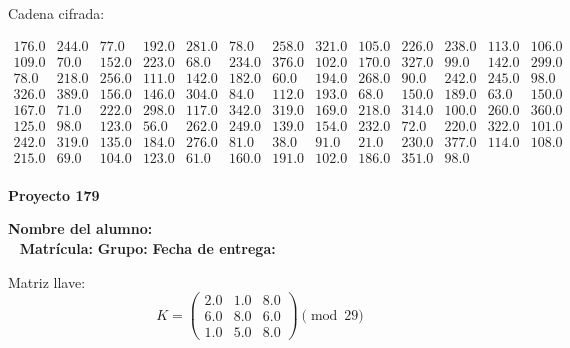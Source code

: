 \documentclass[12pt]{article}
\begin{document}
Cadena cifrada:
\begin{center}
$\begin{array}{lllllllllllll}
176.0 & 244.0 & 77.0 & 192.0 & 281.0 & 78.0 & 258.0 & 321.0 & 105.0 & 226.0 & 238.0 & 113.0 & 106.0\\
109.0 & 70.0 & 152.0 & 223.0 & 68.0 & 234.0 & 376.0 & 102.0 & 170.0 & 327.0 & 99.0 & 142.0 & 299.0\\
78.0 & 218.0 & 256.0 & 111.0 & 142.0 & 182.0 & 60.0 & 194.0 & 268.0 & 90.0 & 242.0 & 245.0 & 98.0\\
326.0 & 389.0 & 156.0 & 146.0 & 304.0 & 84.0 & 112.0 & 193.0 & 68.0 & 150.0 & 189.0 & 63.0 & 150.0\\
167.0 & 71.0 & 222.0 & 298.0 & 117.0 & 342.0 & 319.0 & 169.0 & 218.0 & 314.0 & 100.0 & 260.0 & 360.0\\
125.0 & 98.0 & 123.0 & 56.0 & 262.0 & 249.0 & 139.0 & 154.0 & 232.0 & 72.0 & 220.0 & 322.0 & 101.0\\
242.0 & 319.0 & 135.0 & 184.0 & 276.0 & 81.0 & 38.0 & 91.0 & 21.0 & 230.0 & 377.0 & 114.0 & 108.0\\
215.0 & 69.0 & 104.0 & 123.0 & 61.0 & 160.0 & 191.0 & 102.0 & 186.0 & 351.0 & 98.0\\
\end{array}$
\end{center}

\newpage


\textbf{Proyecto 179}

\textbf{Nombre del alumno:} \underline{\hspace{13cm}}\\\
\vspace{1cm}
\textbf{Matrícula:} \underline{\hspace{4cm}} \hspace{1cm}
\textbf{Grupo:} \underline{\hspace{2cm}}
\textbf{Fecha de entrega:} \underline{\hspace{2cm}}

\medskip

Matriz llave:
\[
K = \begin{pmatrix}
2.0 & 1.0 & 8.0\\
6.0 & 8.0 & 6.0\\
1.0 & 5.0 & 8.0
\end{pmatrix} \pmod{29}
\]
\end{document}
